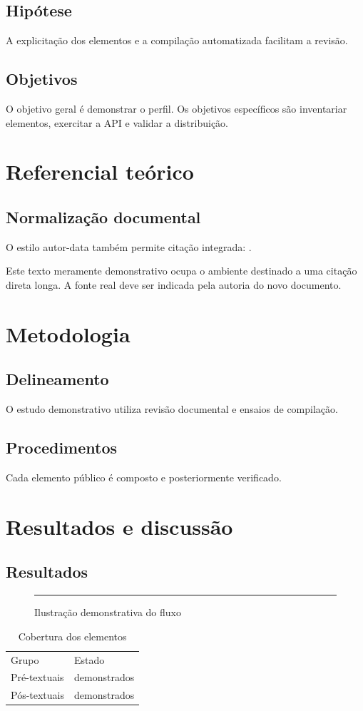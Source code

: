 \documentclass[12pt]{report}
\begin{document}
\section{Hipótese}
A explicitação dos elementos e a compilação automatizada facilitam a revisão.

\section{Objetivos}
O objetivo geral é demonstrar o perfil. Os objetivos específicos são
inventariar elementos, exercitar a API e validar a distribuição.

\chapter{Referencial teórico}
\section{Normalização documental}
O estilo autor-data também permite citação integrada:
\textcite{associacao2025}.
\begin{ABNTEXcitacaolonga}
Este texto meramente demonstrativo ocupa o ambiente destinado a uma citação
direta longa. A fonte real deve ser indicada pela autoria do novo documento.
\end{ABNTEXcitacaolonga}

\chapter{Metodologia}
\section{Delineamento}
O estudo demonstrativo utiliza revisão documental e ensaios de compilação.
\section{Procedimentos}
Cada elemento público é composto e posteriormente verificado.

\chapter{Resultados e discussão}
\section{Resultados}
\begin{figure}[ht]
  \centering
  \rule{0.6\linewidth}{2cm}
  \caption{Ilustração demonstrativa do fluxo}
\end{figure}
\begin{table}[ht]
  \centering
  \caption{Cobertura dos elementos}
  \begin{tabular}{ll}
    Grupo & Estado\\
    Pré-textuais & demonstrados\\
    Pós-textuais & demonstrados
  \end{tabular}
\end{table}
\end{document}
